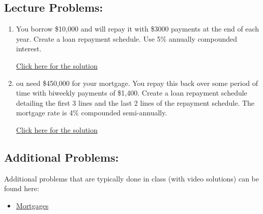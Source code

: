 \documentclass[
]{book}
\providecommand{\tightlist}{%
  \setlength{\itemsep}{0pt}\setlength{\parskip}{0pt}}
\begin{document}
\subsection*{Lecture Problems:}\label{lecture-problems-17}

\begin{enumerate}
\def\labelenumi{\arabic{enumi}.}
\tightlist
\item
  You borrow \$10,000 and will repay it with \$3000 payments at the end of each year. Create a loan repayment schedule. Use 5\% annually compounded interest.

  \href{https://youtu.be/k9lk4D2iPtc}{Click here for the solution}
\item
  ou need \$450,000 for your mortgage. You repay this back over some period of time with biweekly payments of \$1,400. Create a loan repayment schedule detailing the first 3 lines and the last 2 lines of the repayment schedule. The mortgage rate is 4\% compounded semi-annually.

  \href{https://youtu.be/LuDq5KVlKeg}{Click here for the solution}
\end{enumerate}

\subsection*{Additional Problems:}\label{additional-problems-17}

Additional problems that are typically done in class (with video solutions) can be found here:

\begin{itemize}
\tightlist
\item
  \href{https://theelementsmath.github.io/M114/mortgages.html\#mortgage-fundamentals}{Mortgages}
\end{itemize}
\end{document}
